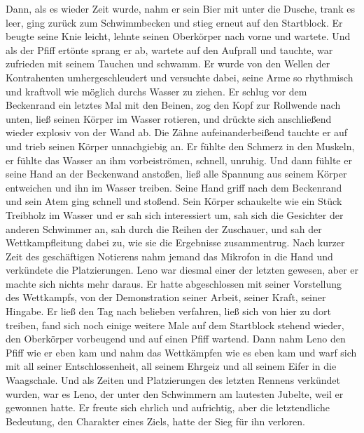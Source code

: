 \documentclass[ngerman,smalldemyvopaper,11pt,oneside,onecolumn,openright,extrafontsizes]{memoir}
\begin{document}
Dann, als es wieder Zeit wurde, nahm er sein Bier mit unter die Dusche, trank es leer, ging zurück zum Schwimmbecken und stieg erneut auf den Startblock. Er beugte seine Knie leicht, lehnte seinen Oberkörper nach vorne und wartete. Und als der Pfiff ertönte sprang er ab, wartete auf den Aufprall und tauchte, war zufrieden mit seinem Tauchen und schwamm. Er wurde von den Wellen der Kontrahenten umhergeschleudert und versuchte dabei, seine Arme so rhythmisch und kraftvoll wie möglich durchs Wasser zu ziehen. Er schlug vor dem Beckenrand ein letztes Mal mit den Beinen, zog den Kopf zur Rollwende nach unten, ließ seinen Körper im Wasser rotieren, und drückte sich anschließend wieder explosiv von der Wand ab. Die Zähne aufeinanderbeißend tauchte er auf und trieb seinen Körper unnachgiebig an. Er fühlte den Schmerz in den Muskeln, er fühlte das Wasser an ihm vorbeiströmen, schnell, unruhig. Und dann fühlte er seine Hand an der Beckenwand anstoßen, ließ alle Spannung aus seinem Körper entweichen und ihn im Wasser treiben. Seine Hand griff nach dem Beckenrand und sein Atem ging schnell und stoßend. Sein Körper schaukelte wie ein Stück Treibholz im Wasser und er sah sich interessiert um, sah sich die Gesichter der anderen Schwimmer an, sah durch die Reihen der Zuschauer, und sah der Wettkampfleitung dabei zu, wie sie die Ergebnisse zusammentrug. Nach kurzer Zeit des geschäftigen Notierens nahm jemand das Mikrofon in die Hand und verkündete die Platzierungen. Leno war diesmal einer der letzten gewesen, aber er machte sich nichts mehr daraus. Er hatte abgeschlossen mit seiner Vorstellung des Wettkampfs, von der Demonstration seiner Arbeit, seiner Kraft, seiner Hingabe. Er ließ den Tag nach belieben verfahren, ließ sich von hier zu dort treiben, fand sich noch einige weitere Male auf dem Startblock stehend wieder, den Oberkörper vorbeugend und auf einen Pfiff wartend. Dann nahm Leno den Pfiff wie er eben kam und nahm das Wettkämpfen wie es eben kam und warf sich mit all seiner Entschlossenheit, all seinem Ehrgeiz und all seinem Eifer in die Waagschale. Und als Zeiten und Platzierungen des letzten Rennens verkündet wurden, war es Leno, der unter den Schwimmern am lautesten Jubelte, weil er gewonnen hatte. Er freute sich ehrlich und aufrichtig, aber die letztendliche Bedeutung, den Charakter eines Ziels, hatte der Sieg für ihn verloren.
\end{document}
